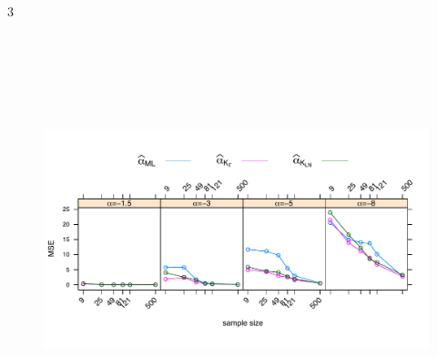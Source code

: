 \documentclass[a0,portrait]{a0poster}
\begin{document}
\begin{parcolumns}[colwidths={1=.3\textwidth,2=.39\textwidth},rulebetweencolor=blue
	,rulebetween=true]{3}
{\begin{minipage}[t]{1\linewidth}
\begin{center}
	\begin{minipage}[t]{0.90\linewidth}
		\begin{figure}
  		\includegraphics[width=20cm, height=12cm]{../../../../Figures/IVJIAAIS2017/SinCont/ECM_500_L3MVyGAyLN_OPTIM_hasta500_MOM1_2_SinCte_Ver2_FINAL.pdf}
 		\end{figure}
  	\end{minipage}
\end{center}


\end{minipage}}
\end{parcolumns}
\end{document}
